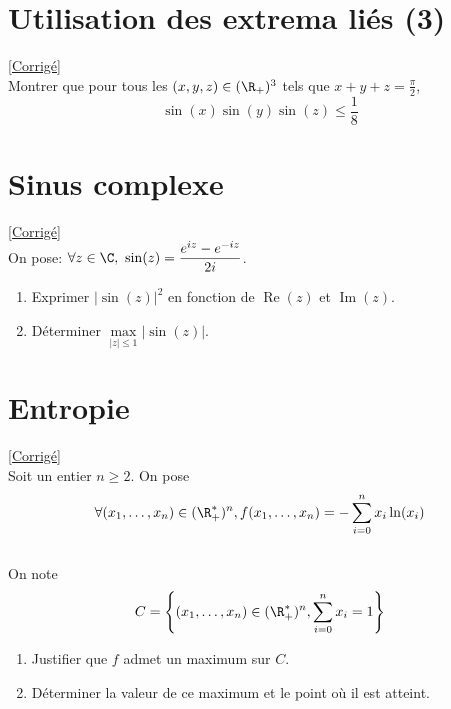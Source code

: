 \documentclass{book}
\begin{document}
\section{Utilisation des extrema liés (3)}
\label{Utilisation des extrema liés 3}
\textcolor{blue}{\hyperref[sec:utilisation-des-extremas-lies-3]{[Corrigé]}}\\
Montrer que pour tous les $(x,y,z)\in (\R_+)^3$ tels que $x+y+z=\displaystyle\frac{\pi}{2}$,
$$\sin(x)\sin(y)\sin(z)\leq \frac{1}{8}$$

\section{Sinus complexe}
\label{Sinus complexe}
\textcolor{blue}{\hyperref[sec:sinus-complexe]{[Corrigé]}}\\
On pose: $\forall z\in\C,\ \sin(z)=\displaystyle\frac{e^{iz}-e^{-iz}}{2i}$.
\begin{enumerate}
	\item Exprimer $|\sin(z)|^2$ en fonction de $\operatorname{Re}(z)$ et $\operatorname{Im}(z)$.
	\item Déterminer $\max\limits_{|z|\leq 1}|\sin(z)|$.
\end{enumerate}

\section{Entropie}
\label{Entropie}
\textcolor{blue}{\hyperref[sec:entropie]{[Corrigé]}}\\
Soit un entier $n\geq 2$. On pose $$\forall(x_1,\dots,x_n)\in(\R^*_+)^n,f(x_1,\dots,x_n)=-\sum\limits_{i=0}^n x_i\ln(x_i)$$
\\On note $$C=\left\{(x_1,\dots,x_n)\in(\R^*_+)^n,\sum\limits_{i=0}^n x_i=1\right\}$$
\begin{enumerate}
	\item Justifier que $f$ admet un maximum sur $C$.
	\item Déterminer la valeur de ce maximum et le point où il est atteint.
\end{enumerate}
\end{document}
